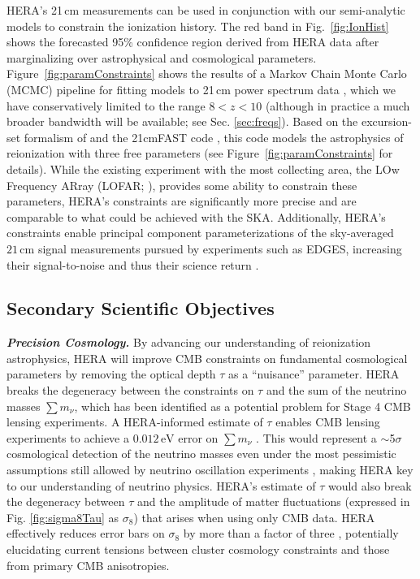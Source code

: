 \documentclass[preprint,11pt]{aastex}
\begin{document}
HERA's 21\,cm measurements can be used in conjunction with our semi-analytic models to constrain the ionization history. 
The red band in Fig.~\ref{fig:IonHist} shows the forecasted 95\% confidence region derived from HERA data after marginalizing over astrophysical and cosmological parameters.
Figure~\ref{fig:paramConstraints} shows the results of a Markov Chain Monte
Carlo (MCMC) pipeline for fitting models to 21\,cm power spectrum data \citep{greig_and_mesinger2015}, which we have conservatively limited to the range $8 < z < 10$ (although in practice a much broader bandwidth will be available; see Sec. \ref{sec:freqs}).
Based on the excursion-set formalism of
\citet{furlanetto_et_al2004} and the 21cmFAST code \citep{mesinger_et_al2011},
this code models the astrophysics of
reionization with three free parameters (see Figure~\ref{fig:paramConstraints} for details). 
While the existing experiment with the most collecting area, 
the LOw Frequency ARray (LOFAR; \citealt{2013A&A...556A...2V, yatawatta_et_al2013}),
provides some ability to constrain these parameters,
HERA's constraints are significantly more precise and are comparable
to what could be achieved with the SKA. 
Additionally, HERA's constraints enable principal component parameterizations of the
sky-averaged $21\,\textrm{cm}$ signal measurements pursued by experiments such as EDGES, increasing their signal-to-noise and thus their science return \citep{liu_parsons2015}.


\subsection{Secondary Scientific Objectives}%

\emph{\textbf{Precision Cosmology.}}
\label{sec:tau}
By advancing our understanding of reionization astrophysics, HERA will improve CMB constraints on 
fundamental cosmological parameters by
removing the optical depth
$\tau$ as a ``nuisance'' parameter. HERA breaks the degeneracy between the
constraints on $\tau$ and the sum of the neutrino masses $\sum m_\nu$, which has
been identified as a potential problem for Stage 4 CMB lensing experiments. A
HERA-informed estimate of $\tau$ enables CMB lensing experiments to achieve a
$0.012\,\textrm{eV}$ error on $\sum m_\nu$ \citep{liu_et_al2015}. This would
represent a $\sim$5$\sigma$ cosmological detection of the neutrino masses even
under the most pessimistic assumptions
still allowed by neutrino oscillation experiments
\citep{allison_et_al2015}, making HERA key to our understanding of neutrino
physics. HERA's estimate of $\tau$ would also break the degeneracy between
$\tau$ and the amplitude of matter fluctuations (expressed in Fig.
\ref{fig:sigma8Tau} as $\sigma_8$) that arises when using only
CMB data. HERA effectively reduces error bars on $\sigma_8$ by more
than a factor of three \citep{liu_et_al2015}, potentially elucidating
current tensions between cluster cosmology constraints and those from primary
CMB anisotropies.
\end{document}
